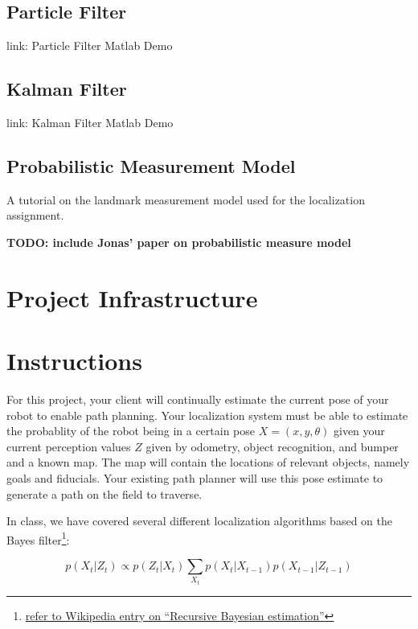 \subsection{Particle Filter}

link: Particle Filter Matlab Demo

\subsection{Kalman Filter}

link: Kalman Filter Matlab Demo

\subsection{Probabilistic Measurement Model}

A tutorial on the landmark measurement model used for the localization assignment.

\textbf{TODO: include Jonas' paper on probabilistic measure model}

\section{Project Infrastructure}

\section{Instructions}

For this project, your client will continually estimate the current pose of your robot to enable path planning.  Your localization system must be able to estimate the probablity of the robot being in a certain pose $X = (x,y,\theta)$ given your current perception values $Z$ given by odometry, object recognition, and bumper and a known map.  The map will contain the locations of relevant objects, namely goals and fiducials.  Your existing path planner will use this pose estimate to generate a path on the field to traverse.

In class, we have covered several different localization algorithms based on the Bayes filter\footnote{\href{http://en.wikipedia.org/wiki/Recursive_Bayesian_estimation}{refer to Wikipedia entry on ``Recursive Bayesian estimation''}}:

\begin{equation}
p(X_{t}|Z_{t}) \propto p(Z_{t}|X_{t}) \sum_{X_t} p(X_{t}|X_{t-1}) p(X_{t-1}|Z_{t-1})
\end{equation}


